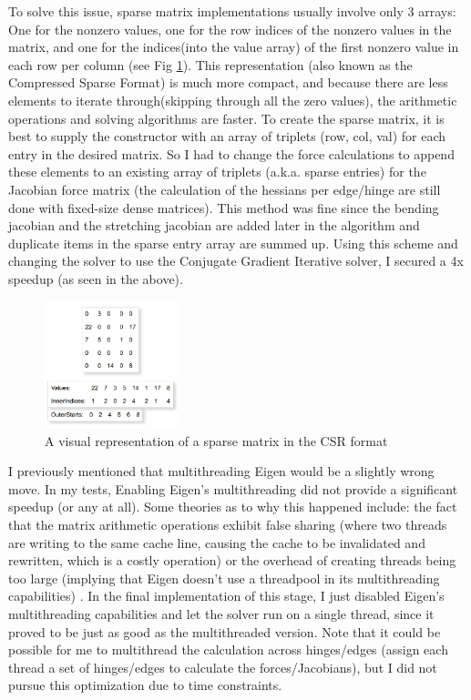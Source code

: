 \documentclass[letterpaper, 10 pt, conference]{ieeeconf}  %
\begin{document}
To solve this issue, sparse matrix implementations usually involve only 3 arrays: One for the nonzero values, one for the row indices of the nonzero values in the matrix, and one for the indices(into the value array) of the first nonzero value in each row per column (see Fig \ref{fig:sparse_matrix}). This representation (also known as the Compressed Sparse Format) is much more compact, and because there are less elements to iterate through(skipping through all the zero values), the arithmetic operations and solving algorithms are faster. To create the sparse matrix, it is best to supply the constructor with an array of triplets (row, col, val) for each entry in the desired matrix. So I had to change the force calculations to append these elements to an existing array of triplets (a.k.a. sparse entries) for the Jacobian force matrix (the calculation of the hessians per edge/hinge are still done with fixed-size dense matrices). This method was fine since the bending jacobian and the stretching jacobian are added later in the algorithm and duplicate items in the sparse entry array are summed up. Using this scheme and changing the solver to use the Conjugate Gradient Iterative solver, I secured a 4x speedup (as seen in the above).

\begin{figure}
        \centering
        \includegraphics[width=0.35\textwidth]{spmat.PNG}
        \caption{A visual representation of a sparse matrix in the CSR format} \label{fig:sparse_matrix}
\end{figure}

I previously mentioned that multithreading Eigen would be a slightly wrong move. In my tests, Enabling Eigen's multithreading did not provide a significant speedup (or any at all). Some theories as to why this happened include: the fact that the matrix arithmetic operations exhibit false sharing (where two threads are writing to the same cache line, causing the cache to be invalidated and rewritten, which is a costly operation) or the overhead of creating threads being too large (implying that Eigen doesn't use a threadpool in its multithreading capabilities) \cite{kernel_false_sharing}. In the final implementation of this stage, I just disabled Eigen's multithreading capabilities and let the solver run on a single thread, since it proved to be just as good as the multithreaded version. Note that it could be possible for me to multithread the calculation across hinges/edges (assign each thread a set of hinges/edges to calculate the forces/Jacobians), but I did not pursue this optimization due to time constraints.
\end{document}

